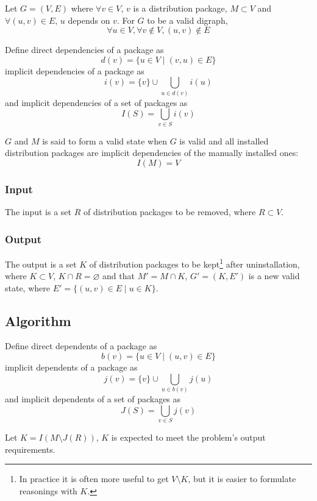 \documentclass[a4paper,12pt]{article}
\begin{document}
Let $G = (V, E)$ where $\forall v \in V$, $v$ is a distribution package,
$M \subset V$ and $\forall (u, v) \in E$, $u$ depends on $v$.
For $G$ to be a valid digraph,
\begin{equation}\label{digraph}
  \forall u \in V, \forall v \notin V, (u, v) \notin E
\end{equation}

Define direct dependencies of a package as
\[d(v) = \{u \in V \mid (v, u) \in E\}\]
implicit dependencies of a package as
\[i(v) = \{v\} \cup \bigcup_{u \in d(v)} i(u)\]
and implicit dependencies of a set of packages as
\[I(S) = \bigcup_{v \in S} i(v)\]

$G$ and $M$ is said to form a valid state when $G$ is valid
and all installed distribution packages are implicit dependencies
of the manually installed ones:
\begin{equation}\label{useful}
  I(M) = V
\end{equation}

\subsubsection{Input}
The input is a set $R$ of distribution packages to be removed,
where $R \subset V$.

\subsubsection{Output}
The output is a set $K$ of distribution packages to be kept\footnote{In practice
it is often more useful to get $V \setminus K$, but it is easier to formulate
reasonings with $K$.} after uninstallation, where $K \subset V$,
$K \cap R = \varnothing$ and that $M' = M \cap K$, $G' = (K, E')$
is a new valid state, where $E' = \{(u, v) \in E \mid u \in K\}$.

\subsection{Algorithm}
Define direct dependents of a package as
\[b(v) = \{u \in V \mid (u, v) \in E\}\]
implicit dependents of a package as
\[j(v) = \{v\} \cup \bigcup_{u \in b(v)} j(u)\]
and implicit dependents of a set of packages as
\[J(S) = \bigcup_{v \in S} j(v)\]

Let $K = I(M \setminus J(R))$,
$K$ is expected to meet the problem's output requirements.
\end{document}
